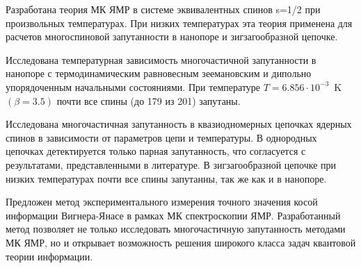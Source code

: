 \item
Разработана теория МК ЯМР в системе эквивалентных спинов s=1/2 при произвольных температурах. При низких температурах эта теория применена для расчетов многоспиновой запутанности в
нанопоре и зигзагообразной цепочке.

\item
Исследована температурная зависимость многочастичной запутанности в нанопоре с термодинамическим равновесным зеемановским и дипольно упорядоченным начальными состояниями.
При температуре
$T = 6.856\cdot10^{-3}$~K $(\beta=3.5)$
почти все спины (до 179 из 201) запутаны.

\item
Исследована многочастичная запутанность в квазиодномерных цепочках ядерных спинов в зависимости от параметров цепи и температуры.
В однородных цепочках детектируется только парная запутанность, что согласуется с результатами, представленными в литературе.
В зигзагообразной цепочке при низких температурах почти все спины запутанны, так же как и в нанопоре.

\item
Предложен метод экспериментального измерения точного значения косой информации Вигнера-Янасе в рамках МК спектроскопии ЯМР.
Разработанный метод позволяет не только исследовать многочастичную запутанность методами МК ЯМР,
но и открывает возможность решения широкого класса задач квантовой теории информации.

